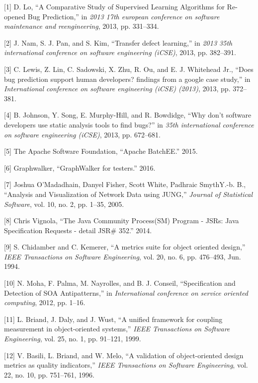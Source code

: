\documentclass[conference]{IEEEtran}
\begin{document}
\small

{[}1{]} D. Lo, ``A Comparative Study of Supervised Learning Algorithms
for Re-opened Bug Prediction,'' in \emph{2013 17th european conference
on software maintenance and reengineering}, 2013, pp. 331--334.

{[}2{]} J. Nam, S. J. Pan, and S. Kim, ``Transfer defect learning,'' in
\emph{2013 35th international conference on software engineering
(iCSE)}, 2013, pp. 382--391.

{[}3{]} C. Lewis, Z. Lin, C. Sadowski, X. Zhu, R. Ou, and E. J.
{Whitehead Jr.}, ``Does bug prediction support human developers?
findings from a google case study,'' in \emph{International conference
on software engineering (iCSE) (2013)}, 2013, pp. 372--381.

{[}4{]} B. Johnson, Y. Song, E. Murphy-Hill, and R. Bowdidge, ``Why
don't software developers use static analysis tools to find bugs?'' in
\emph{35th international conference on software engineering (iCSE)},
2013, pp. 672--681.

{[}5{]} The Apache Software Foundation, ``Apache BatchEE.'' 2015.

{[}6{]} Graphwalker, ``GraphWalker for testers.'' 2016.

{[}7{]} {Joshua O'Madadhain, Danyel Fisher, Scott White, Padhraic
Smyth}Y.-b. B., ``Analysis and Visualization of Network Data using
JUNG,'' \emph{Journal of Statistical Software}, vol. 10, no. 2, pp.
1--35, 2005.

{[}8{]} Chris Vignola, ``The Java Community Process(SM) Program - JSRs:
Java Specification Requests - detail JSR\# 352.'' 2014.

{[}9{]} S. Chidamber and C. Kemerer, ``A metrics suite for object
oriented design,'' \emph{IEEE Transactions on Software Engineering},
vol. 20, no. 6, pp. 476--493, Jun. 1994.

{[}10{]} N. Moha, F. Palma, M. Nayrolles, and B. J. Conseil,
``Specification and Detection of SOA Antipatterns,'' in
\emph{International conference on service oriented computing}, 2012, pp.
1--16.

{[}11{]} L. Briand, J. Daly, and J. Wust, ``A unified framework for
coupling measurement in object-oriented systems,'' \emph{IEEE
Transactions on Software Engineering}, vol. 25, no. 1, pp. 91--121,
1999.

{[}12{]} V. Basili, L. Briand, and W. Melo, ``A validation of
object-oriented design metrics as quality indicators,'' \emph{IEEE
Transactions on Software Engineering}, vol. 22, no. 10, pp. 751--761,
1996.
\end{document}
